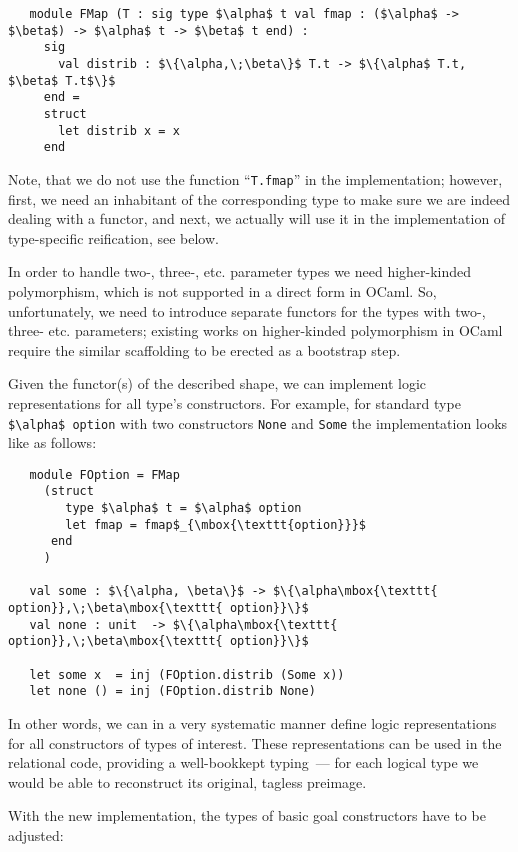 \begin{lstlisting}
   module FMap (T : sig type $\alpha$ t val fmap : ($\alpha$ -> $\beta$) -> $\alpha$ t -> $\beta$ t end) :
     sig
       val distrib : $\{\alpha,\;\beta\}$ T.t -> $\{\alpha$ T.t, $\beta$ T.t$\}$
     end =
     struct
       let distrib x = x
     end
\end{lstlisting}

Note, that we do not use the function ``\lstinline{T.fmap}'' in the implementation; however, first, we need an inhabitant of the
corresponding type to make sure we are indeed dealing with a functor, and next, we actually will use it in the
implementation of type-specific reification, see below.

In order to handle two-, three-, etc. parameter types we need higher-kinded polymorphism, which is
not supported in a direct form in OCaml. So, unfortunately, we need to introduce separate
functors for the types with two-, three- etc. parameters; existing works on higher-kinded
polymorphism in OCaml~\cite{HKinded} require the similar scaffolding to be erected as a bootstrap step.

Given the functor(s) of the described shape, we can implement logic representations for
all type's constructors. For example, for standard type \lstinline{$\alpha$ option} with two constructors
\lstinline{None} and \lstinline{Some} the implementation looks like as follows:

\begin{lstlisting}
   module FOption = FMap
     (struct
        type $\alpha$ t = $\alpha$ option
        let fmap = fmap$_{\mbox{\texttt{option}}}$
      end
     )

   val some : $\{\alpha, \beta\}$ -> $\{\alpha\mbox{\texttt{ option}},\;\beta\mbox{\texttt{ option}}\}$
   val none : unit  -> $\{\alpha\mbox{\texttt{ option}},\;\beta\mbox{\texttt{ option}}\}$

   let some x  = inj (FOption.distrib (Some x))
   let none () = inj (FOption.distrib None)
\end{lstlisting}

In other words, we can in a very systematic manner define logic representations for all constructors
of types of interest. These representations can be used in the relational code, providing a well-bookkept
typing~--- for each logical type we would be able to reconstruct its original, tagless preimage.

With the new implementation, the types of basic goal constructors have to be adjusted:

